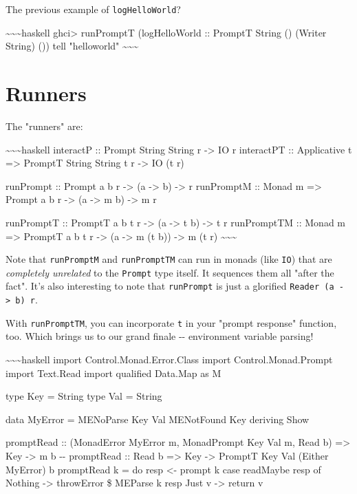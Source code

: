 \documentclass[]{article}
\begin{document}
The previous example of \texttt{logHelloWorld}?

\textasciitilde{}\textasciitilde{}\textasciitilde{}haskell ghci\textgreater{}
runPromptT (logHelloWorld :: PromptT String () (Writer String) ()) tell
"helloworld" \textasciitilde{}\textasciitilde{}\textasciitilde{}

\section{Runners}

The "runners" are:

\textasciitilde{}\textasciitilde{}\textasciitilde{}haskell interactP :: Prompt
String String r -\textgreater{} IO r interactPT :: Applicative t =\textgreater{}
PromptT String String t r -\textgreater{} IO (t r)

runPrompt :: Prompt a b r -\textgreater{} (a -\textgreater{} b) -\textgreater{}
r runPromptM :: Monad m =\textgreater{} Prompt a b r -\textgreater{} (a
-\textgreater{} m b) -\textgreater{} m r

runPromptT :: PromptT a b t r -\textgreater{} (a -\textgreater{} t b)
-\textgreater{} t r runPromptTM :: Monad m =\textgreater{} PromptT a b t r
-\textgreater{} (a -\textgreater{} m (t b)) -\textgreater{} m (t r)
\textasciitilde{}\textasciitilde{}\textasciitilde{}

Note that \texttt{runPromptM} and \texttt{runPromptTM} can run in monads (like
\texttt{IO}) that are \emph{completely unrelated} to the \texttt{Prompt} type
itself. It sequences them all "after the fact". It's also interesting to note
that \texttt{runPrompt} is just a glorified
\texttt{Reader\ (a\ -\textgreater{}\ b)\ r}.

With \texttt{runPromptTM}, you can incorporate \texttt{t} in your "prompt
response" function, too. Which brings us to our grand finale -\/- environment
variable parsing!

\textasciitilde{}\textasciitilde{}\textasciitilde{}haskell import
Control.Monad.Error.Class import Control.Monad.Prompt import Text.Read import
qualified Data.Map as M

type Key = String type Val = String

data MyError = MENoParse Key Val \textbar{} MENotFound Key deriving Show

promptRead :: (MonadError MyError m, MonadPrompt Key Val m, Read b)
=\textgreater{} Key -\textgreater{} m b -\/- promptRead :: Read b
=\textgreater{} Key -\textgreater{} PromptT Key Val (Either MyError) b
promptRead k = do resp \textless{}- prompt k case readMaybe resp of Nothing
-\textgreater{} throwError \$ MEParse k resp Just v -\textgreater{} return v
\end{document}
